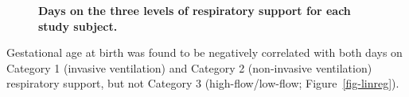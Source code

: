 \documentclass[
  letterpaper,
  DIV=11,
  numbers=noendperiod]{scrartcl}
\begin{document}
\begin{figure}


\caption{\label{fig-distribution}\textbf{Days on the three levels of
respiratory support for each study subject.}}

\end{figure}%

Gestational age at birth was found to be negatively correlated with both
days on Category 1 (invasive ventilation) and Category 2 (non-invasive
ventilation) respiratory support, but not Category 3
(high-flow/low-flow; Figure~\ref{fig-linreg}).
\end{document}
